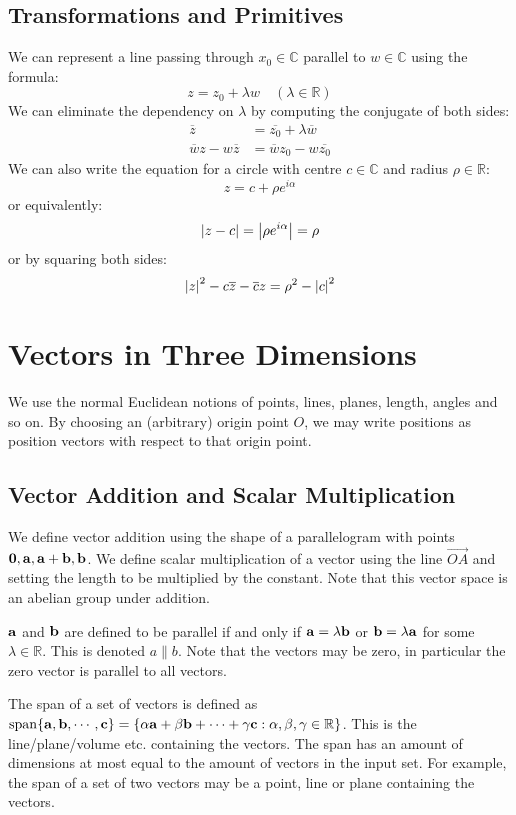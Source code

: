 \documentclass{article}
\begin{document}
\subsection{Transformations and Primitives}
We can represent a line passing through $x_0\in \mathbb C$ parallel to $w \in \mathbb C$ using the formula:
\[ z = z_0 + \lambda w\quad(\lambda \in \mathbb R) \]
We can eliminate the dependency on $\lambda$ by computing the conjugate of both sides:
\begin{align*}
	\overline{z}                  & = \overline{z_0} + \lambda \overline{w} \\
	\overline{w}z - w\overline{z} & = \overline{w}z_0 - w\overline{z_0}
\end{align*} %
We can also write the equation for a circle with centre $c \in \mathbb C$ and radius $\rho \in \mathbb R$:
\[ z = c + \rho e^{i\alpha} \]
or equivalently:
\[ \abs{z - c} = \abs{\rho e^{i\alpha}} = \rho \]
or by squaring both sides:
\[ \abs{z}^2 - c\overline{z} - \overline{c}z = \rho^2 - \abs{c}^2 \]

\section{Vectors in Three Dimensions}
We use the normal Euclidean notions of points, lines, planes, length, angles and so on. By choosing an (arbitrary) origin point $O$, we may write positions as position vectors with respect to that origin point.

\subsection{Vector Addition and Scalar Multiplication}
We define vector addition using the shape of a parallelogram with points $\vb 0, \vb a, \vb a + \vb b, \vb b$. We define scalar multiplication of a vector using the line $\overrightarrow{OA}$ and setting the length to be multiplied by the constant. Note that this vector space is an abelian group under addition.
\begin{definition}
	$\vb a$ and $\vb b$ are defined to be parallel if and only if $\vb a = \lambda \vb b$ or $\vb b = \lambda \vb a$ for some $\lambda \in \mathbb R$. This is denoted $a \parallel b$. Note that the vectors may be zero, in particular the zero vector is parallel to all vectors.
\end{definition}
\begin{definition}
	The span of a set of vectors is defined as $\operatorname{span} \{\vb a, \vb b, \cdots, \vb c\} = \{ \alpha \vb a + \beta \vb b + \cdots + \gamma \vb c: \alpha, \beta, \gamma \in \mathbb R \}$. This is the line/plane/volume etc. containing the vectors. The span has an amount of dimensions at most equal to the amount of vectors in the input set. For example, the span of a set of two vectors may be a point, line or plane containing the vectors.
\end{definition}
\end{document}
